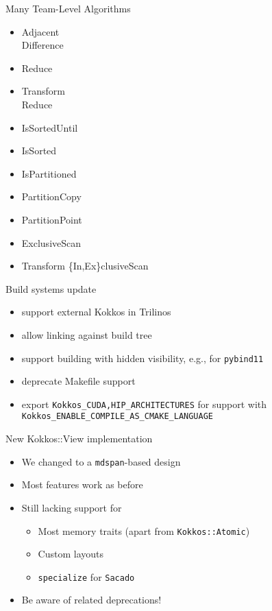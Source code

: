 \begin{frame}[fragile]{Many Team-Level Algorithms}
\begin{multicols}{4}
\begin{itemize}
\end{itemize}
\columnbreak
\begin{itemize}

    \itemsep0em
    \item {Adjacent\\Difference}
    \item Reduce
    \item {Transform\\Reduce}
    \item IsSortedUntil
    \item IsSorted
    \item IsPartitioned
    \item PartitionCopy
    \item PartitionPoint
    \item ExclusiveScan
    \item {Transform \{In,Ex\}clusiveScan}
    
    
    
\end{itemize}
\end{multicols}
\end{frame}

\begin{frame}[fragile]{Build systems update}
  \begin{itemize}
    \item support external Kokkos in Trilinos
    \item allow linking against build tree
    \item support building with hidden visibility, e.g., for \texttt{pybind11}
    \item deprecate Makefile support
    \item export \texttt{Kokkos\_{CUDA,HIP}\_ARCHITECTURES} for support with \texttt{Kokkos\_ENABLE\_COMPILE\_AS\_CMAKE\_LANGUAGE}
  \end{itemize}
\end{frame}

\begin{frame}[fragile]{New Kokkos::View implementation}
  \begin{itemize}
    \item We changed to a \texttt{mdspan}-based design
    \item Most features work as before
    \item Still lacking support for
      \begin{itemize}
        \item Most memory traits (apart from \texttt{Kokkos::Atomic})
        \item Custom layouts
        \item \texttt{specialize} for \texttt{Sacado}
      \end{itemize}
    \item Be aware of related deprecations!
  \end{itemize}
\end{frame}

